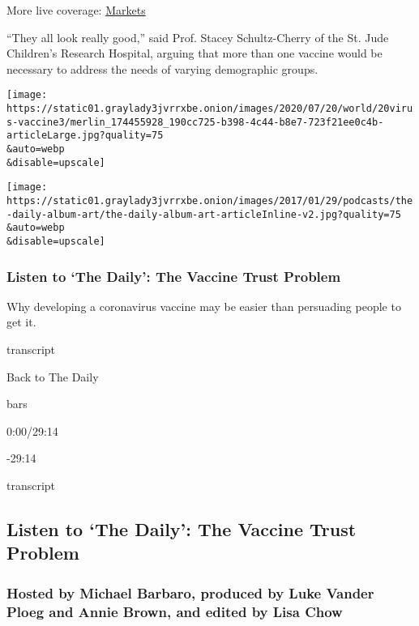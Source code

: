 More live coverage:
\href{https://www.nytimes3xbfgragh.onion/live/2020/09/04/business/stock-market-today-coronavirus?action=click\&pgtype=Article\&state=default\&region=MAIN_CONTENT_1\&context=storylines_live_updates}{Markets}

``They all look really good,'' said Prof. Stacey Schultz-Cherry of the
St. Jude Children's Research Hospital, arguing that more than one
vaccine would be necessary to address the needs of varying demographic
groups.

\texttt{[image: https://static01.graylady3jvrrxbe.onion/images/2020/07/20/world/20virus-vaccine3/merlin\_174455928\_190cc725-b398-4c44-b8e7-723f21ee0c4b-articleLarge.jpg?quality=75\\\&auto=webp\\\&disable=upscale]}

\texttt{[image: https://static01.graylady3jvrrxbe.onion/images/2017/01/29/podcasts/the-daily-album-art/the-daily-album-art-articleInline-v2.jpg?quality=75\\\&auto=webp\\\&disable=upscale]}

\hypertarget{listen-to-the-daily-the-vaccine-trust-problem}{%
\subsubsection{Listen to `The Daily': The Vaccine Trust
Problem}\label{listen-to-the-daily-the-vaccine-trust-problem}}

Why developing a coronavirus vaccine may be easier than persuading
people to get it.

transcript

Back to The Daily

bars

0:00/29:14

-29:14

transcript

\hypertarget{listen-to-the-daily-the-vaccine-trust-problem-1}{%
\subsection{Listen to `The Daily': The Vaccine Trust
Problem}\label{listen-to-the-daily-the-vaccine-trust-problem-1}}

\hypertarget{hosted-by-michael-barbaro-produced-by-luke-vander-ploeg-and-annie-brown-and-edited-by-lisa-chow}{%
\subsubsection{Hosted by Michael Barbaro, produced by Luke Vander Ploeg
and Annie Brown, and edited by Lisa
Chow}\label{hosted-by-michael-barbaro-produced-by-luke-vander-ploeg-and-annie-brown-and-edited-by-lisa-chow}}

